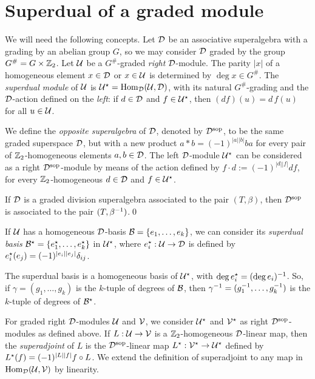 \documentclass{amsbook}
\begin{document}
\section{Superdual of a graded module}\label{ssec:superdual}

We will need the following concepts. Let $\mathcal{D}$ be an associative superalgebra with a grading by an abelian group $G$, so we may consider $\mathcal{D}$ graded by the group $G^\# = G\times \mathbb{Z}_2$. Let $\mathcal U$ be a $G^\#$-graded \emph{right} $\mathcal{D}$-module. The parity $|x|$ of a homogeneous element $x \in \mathcal{D}$ or $x\in \mathcal U$ is determined by $\deg x \in G^\#$. The \emph{superdual module} of $\mathcal U$ is $\mathcal U^\star = \operatorname{Hom}_{\mathcal{D}} (\mathcal U,\mathcal{D})$, with its natural $G^\#$-grading and the $\mathcal{D}$-action defined on the \emph{left}: if $d \in \mathcal{D}$ and $f \in \mathcal U ^\star$, then $(df)(u) = d\, f(u)$ for all $u\in \mathcal U$.

We define the \emph{opposite superalgebra} of $\mathcal{D}$, denoted by $\mathcal{D}^{\mathrm{sop}}$, to be the same graded superspace $\mathcal{D}$, but with a new product $a*b = (-1)^{|a||b|} ba$ for every pair of $\mathbb{Z}_2$-homogeneous elements $a,b \in \mathcal{D}$. The left $\mathcal{D}$-module $\mathcal U^\star$ can be considered as a right $\mathcal{D}^{\mathrm{sop}}$-module by means of the action defined by $f\cdot d := (-1)^{|d||f|} df$, for every $\mathbb{Z}_2$-homogeneous $d\in \mathcal{D}$ and $f\in \mathcal U^\star$.

\begin{lemma}\label{lemma:Dsop}
	If $\mathcal{D}$ is a graded division superalgebra associated to the pair $(T,\beta)$, then $\mathcal{D}^{\mathrm{sop}}$ is associated to the pair $(T,\beta^{-1})$.\qed
\end{lemma}

If $\mathcal U$ has a homogeneous $\mathcal{D}$-basis $\mathcal B = \{e_1, \ldots, e_k\}$, we can consider its \emph{superdual basis} $\mathcal B^\star = \{e_1^\star, \ldots, e_k^\star\}$ in $\mathcal U^\star$, where $e_i^\star : \mathcal U \rightarrow \mathcal{D}$ is defined by $e_i^\star (e_j) = (-1)^{|e_i||e_j|} \delta_{ij}$.

\begin{remark}\label{rmk:gamma-inv}
	The superdual basis is a homogeneous basis of $\mathcal U^\star$, with $\deg e_i^\star = (\deg e_i)^{-1}$. So, if $\gamma = (g_1, \ldots, g_k)$ is the $k$-tuple of degrees of $\mathcal B$, then $\gamma^{-1} = (g_1^{-1}, \ldots, g_k^{-1})$ is the $k$-tuple of degrees of $\mathcal B^\star$.
\end{remark}

For graded right $\mathcal{D}$-modules $\mathcal U$ and $\mathcal V$, we consider $\mathcal U^\star$ and $\mathcal V^\star$ as right $\mathcal{D}^{\mathrm{sop}}$-modules as defined above. If $L:\mathcal U \rightarrow \mathcal V$ is a $\mathbb{Z}_2$-homogeneous $\mathcal{D}$-linear map, then the \emph{superadjoint} of $L$ is the $\mathcal{D}^{\mathrm{sop}}$-linear map $L^\star: \mathcal V^\star \rightarrow \mathcal U^\star$ defined by $L^\star (f) = (-1)^{|L||f|} f \circ L$. We extend the definition of superadjoint to any map in $\operatorname{Hom}_{\mathcal{D}} (\mathcal U, \mathcal V)$ by linearity.
\end{document}
